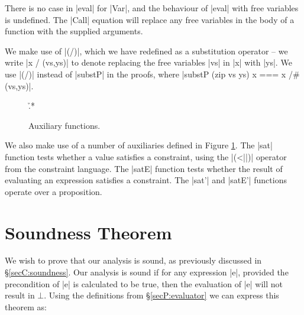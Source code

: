 There is no case in |eval| for |Var|, and the behaviour of |eval| with free variables is undefined. The |Call| equation will replace any free variables in the body of a function with the supplied arguments.

We make use of |(/)|, which we have redefined as a substitution operator -- we write |x / (vs,ys)| to denote replacing the free variables |vs| in |x| with |ys|. We use |(/)| instead of |substP| in the proofs, where |substP (zip vs ys) x === x /# (vs,ys)|.

\begin{figure}
\h{.*}
\caption{Auxiliary functions.}
\label{figP:auxiliary}
\end{figure}

We also make use of a number of auxiliaries defined in Figure \ref{figP:auxiliary}. The |sat| function tests whether a value satisfies a constraint, using the |(<||)| operator from the constraint language. The |satE| function tests whether the result of evaluating an expression satisfies a constraint. The |sat'| and |satE'| functions operate over a proposition.

\section{Soundness Theorem}
\label{secP:theorem}

We wish to prove that our analysis is sound, as previously discussed in \S\ref{secC:soundness}. Our analysis is sound if for any expression |e|, provided the precondition of |e| is calculated to be true, then the evaluation of |e| will not result in $\bot{}$. Using the definitions from \S\ref{secP:evaluator} we can express this theorem as:

